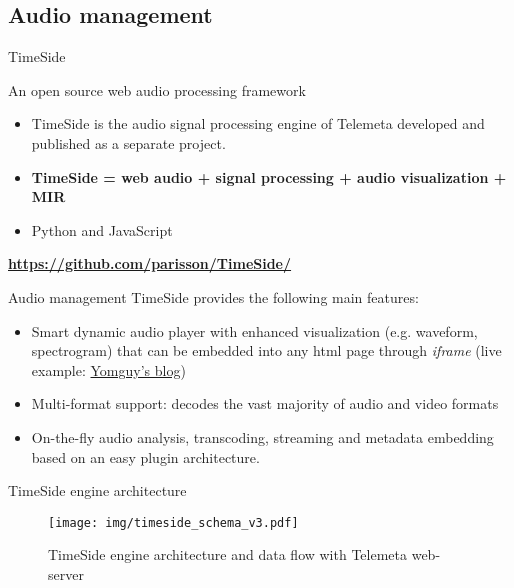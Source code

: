 \documentclass[final, hyperref, table]{beamer}
\begin{document}
\subsection{Audio management}
\begin{frame}{TimeSide}\scriptsize
 \begin{block}{An open source web audio processing framework}
   \begin{itemize}
   \item TimeSide is the \alert{audio signal processing engine} of Telemeta developed and published as a separate project.
   \item \textbf{TimeSide = \textsf{web audio + signal processing + audio visualization + MIR}}  
   \item \alert{Python} and \alert{JavaScript}
   \end{itemize}
\vspace{-0.5cm}\begin{center}
  \colorbox{yellow!40}{\bf \url{https://github.com/parisson/TimeSide/} }
\end{center}
\end{block}
\begin{block}{Audio management}
  TimeSide provides the following main features:
  \begin{itemize}
   \item Smart dynamic audio player with enhanced visualization (e.g. waveform,
    spectrogram) that can be embedded into any html page through \emph{iframe} (live example: \href{http://yomix.org/telemeta-1-embedded-timeside-player.html}{Yomguy's blog})
  \item Multi-format support: decodes the vast majority of audio and
    video formats%
  \item On-the-fly audio analysis, transcoding, streaming and metadata embedding
    based on an easy plugin architecture.
  \end{itemize}
\end{block}

 
\end{frame} 

\begin{frame}{TimeSide engine architecture}
  \begin{figure}[htbp]
  \centering
  \texttt{[image: img/timeside\_schema\_v3.pdf]}
  \caption{TimeSide engine architecture and data flow with Telemeta web-server}\label{fig:TimeSide_Archi}
\end{figure}
\end{frame}
  
\end{document}
